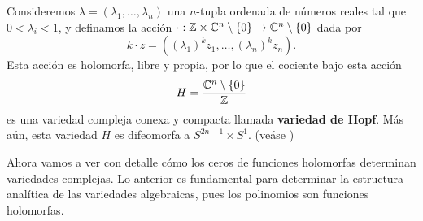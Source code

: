     \begin{example}
	    	Consideremos $\lambda=(\lambda_1,\dots,\lambda_n)$ una $n$-tupla ordenada de números reales tal que $0<\lambda_i<1$, y definamos la acción $\cdot:\mathbb{Z}\times\mathbb{C}^n\setminus\{0\}\to\mathbb{C}^n\setminus\{0\}$ dada por
	    	\begin{equation*}
		    		k\cdot z=((\lambda_1)^kz_1,\dots,(\lambda_n)^kz_n).
		    	\end{equation*}
	    	Esta acción es holomorfa, libre y propia, por lo que el cociente bajo esta acción
	    	\begin{equation*}
		    		H=\frac{\mathbb{C}^n\setminus\{0\}}{\mathbb{Z}}
		    	\end{equation*}
	    	es una variedad compleja conexa y compacta llamada \textbf{variedad de Hopf}. Más aún, esta variedad $H$ es difeomorfa a $S^{2n-1}\times S^1$. (veáse \parencite[Example 1.19]{leecomplex})
	    \end{example}

Ahora vamos a ver con detalle cómo los ceros de funciones holomorfas determinan variedades complejas. Lo anterior es fundamental para determinar la estructura analítica de las variedades algebraicas, pues los polinomios son funciones holomorfas.

